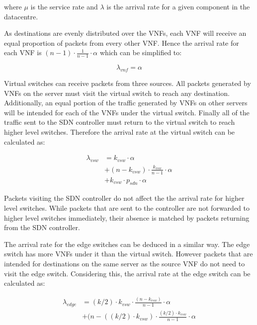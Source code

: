 \noindent where $\mu$ is the service rate and $\lambda$ is the arrival rate for a given component in the datacentre.

As destinations are evenly distributed over the VNFs, each VNF will receive an equal proportion of packets from every other VNF. Hence the arrival rate for each VNF is $(n - 1) \cdot \frac{1}{n - 1} \cdot \alpha$ which can be simplified to: 

\begin{equation}
\label{eq:arr_vnf}
\lambda_{vnf} = \alpha
\end{equation}

Virtual switches can receive packets from three sources. All packets generated by VNFs on the server must visit the virtual switch to reach any destination. Additionally, an equal portion of the traffic generated by VNFs on other servers will be intended for each of the VNFs under the virtual switch. Finally all of the traffic sent to the SDN controller must return to the virtual switch to reach higher level switches. Therefore the arrival rate at the virtual switch can be calculated as:

\begin{equation}
\label{eq:arr_srv}
\begin{split}
\lambda_{vsw} &= k_{vsw} \cdot \alpha \\
			  &+ (n - k_{vsw}) \cdot  \frac{k_{vsw}}{n - 1} \cdot \alpha \\
			  &+ k_{vsw} \cdot p_{sdn} \cdot \alpha
\end{split}
\end{equation}

Packets visiting the SDN controller do not affect the the arrival rate for higher level switches. While packets that are sent to the controller are not forwarded to higher level switches immediately, their absence is matched by packets returning from the SDN controller.

The arrival rate for the edge switches can be deduced in a similar way. The edge switch has more VNFs under it than the virtual switch. However packets that are intended for destinations on the same server as the source VNF do not need to visit the edge switch. Considering this, the arrival rate at the edge switch can be calculated as:

\begin{equation}
\label{eq:arr_edge}
\begin{split}
\lambda_{edge} &= (k/2) \cdot k_{vsw} \cdot \frac{(n - k_{vsw})}{n - 1} \cdot \alpha \\
			   &+ (n - ((k/2) \cdot k_{vsw}) \cdot \frac{(k/2) \cdot k_{vsw}}{n - 1} \cdot \alpha 
\end{split}
\end{equation}

